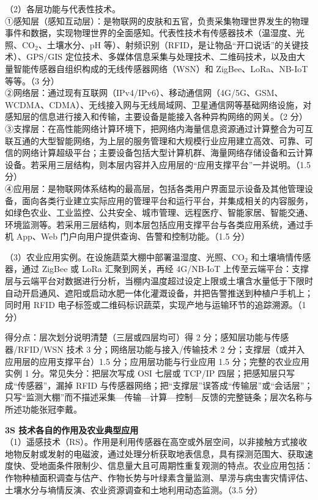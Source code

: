 \documentclass[a4paper,11pt]{article}
\begin{document}
（2）各层功能与代表性技术。\\
①感知层（感知互动层）：是物联网的皮肤和五官，负责采集物理世界发生的物理事件和数据，实现物理世界的全面感知。代表性技术有传感器技术（温湿度、光照、CO$_2$、土壤水分、pH 等）、射频识别（RFID，是让物品“开口说话”的关键技术）、GPS/GIS 定位技术、多媒体信息采集与处理技术、二维码技术，以及由大量智能传感器自组织构成的无线传感器网络（WSN）和 ZigBee、LoRa、NB-IoT 等等。（3 分）\\
②网络层：通过现有互联网（IPv4/IPv6）、移动通信网（4G/5G、GSM、WCDMA、CDMA）、无线接入网与无线局域网、卫星通信网等基础网络设施，对感知层的信息进行接入和传输，主要设备是能接入各种异构网络的网关。（2 分）\\
③支撑层：在高性能网络计算环境下，把网络内海量信息资源通过计算整合为可互联互通的大型智能网络，为上层的服务管理和大规模行业应用建立高效、可靠、可信的网络计算超级平台；主要设备包括大型计算机群、海量网络存储设备和云计算设备。若采用三层结构，则本层内容并入应用层的“应用支撑平台”一并说明。（1.5 分）\\
④应用层：是物联网体系结构的最高层，包括各类用户界面显示设备及其他管理设备，面向各类行业建立实际应用的管理平台和运行平台，并集成相关的内容服务，如绿色农业、工业监控、公共安全、城市管理、远程医疗、智能家居、智能交通、环境监测等。若采用三层结构，则本层包括应用支撑平台与各类应用系统，通过手机 App、Web 门户向用户提供查询、告警和控制功能。（1.5 分）

（3）农业应用实例。在设施蔬菜大棚中部署温湿度、光照、CO$_2$ 和土壤墒情传感器，通过 ZigBee 或 LoRa 汇聚到网关，再经 4G/NB-IoT 上传至云端平台：支撑层与云端平台对数据进行分析，当棚内温度超过设定上限或土壤含水量低于下限时自动开启通风、遮阳或启动水肥一体化灌溉设备，并把告警推送到种植户手机上；同时用 RFID 电子标签或二维码标识蔬菜，实现产地与运输环节的追踪溯源。（1 分）
\begin{analysis}得分点：层次划分说明清楚（三层或四层均可）得 2 分；感知层功能与传感器/RFID/WSN 技术 3 分；网络层功能与接入/传输技术 2 分；支撑层（或并入应用层的应用支撑平台）1.5 分；应用层功能与行业应用 1.5 分；完整的农业应用实例 1 分。常见失分：把层次写成 OSI 七层或 TCP/IP 四层；把感知层只写成“传感器”，漏掉 RFID 与传感器网络；把“支撑层”误答成“传输层”或“会话层”；只写“监测大棚”而不描述采集—传输—计算—控制—反馈的完整链条；层次名称与所述功能张冠李戴。\end{analysis}

\q \textbf{3S 技术各自的作用及农业典型应用}\\
（1）遥感技术（RS）。作用是利用传感器在高空或外层空间，以非接触方式接收地物反射或发射的电磁波，通过处理分析获取地表信息，具有探测范围大、获取速度快、受地面条件限制少、信息量大且可周期性重复观测的特点。农业应用包括：作物种植面积调查与估产、作物长势与叶绿素含量监测、旱涝与病虫害灾情评估、土壤水分与墒情反演、农业资源调查和土地利用动态监测。（3.5 分）
\end{document}
